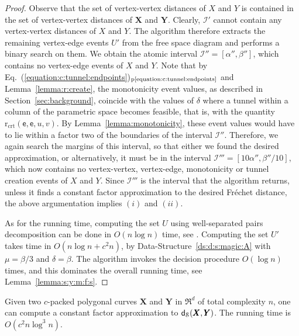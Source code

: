 \documentclass[12pt]{article}
\newcommand{\secref}[1]{Section~\ref{sec:#1}}
\newcommand{\lemlab}[1]{\label{lemma:#1}}
\newcommand{\lemref}[1]{Lemma~\ref{lemma:#1}}
\newcommand{\Eqrefpage}[1]{Eq.~(\ref{equation:#1})$_\text{p\pageref{equation:#1}}$}
\newcommand{\dsref}[1]{Data-Structure~\ref{ds:#1}}
\newcommand{\Frechet}{Fr\'{e}c{h}e{}t\xspace}\providecommand{\Arr}{\mathop{\mathrm{\EuScript{A}}}}
\newcommand{\distoSFr}[2]{\mathsf{d}_{\EuScript{S}}\pth{#1,#2}}
\newcommand{\SimplifyX}[1]{#1}
\newcommand{\cXBase}{X} \newcommand{\cYBase}{Y} \newcommand{\crvCBase}{{\pi}}
\newcommand{\cX}{\SimplifyX{\cXBase}}
\newcommand{\cXOrig}{\pmb{\cXBase}}
\newcommand{\cY}{\SimplifyX{\cYBase}}
\newcommand{\cYOrig}{\pmb{\cYBase}}
\providecommand{\pth}[2][\!]{#1\left({#2}\right)}
\newcommand{\edge}{\mathsf{e}}
\newcommand{\rCreate}[4]{\mathrm{r}_{\mathrm{crt}}\pth{#1, #2, #3,#4}}
\newcommand{\Interval}{\mathcal{I}}
\numberwithin{figure}{section}
\numberwithin{equation}{section}
\begin{document}
\begin{proof}
    Observe that the set of vertex-vertex distances of $\cX$ and $\cY$
    is contained in the set of vertex-vertex distances of $\cXOrig$
    and $\cYOrig$. Clearly, $\Interval'$ cannot contain any
    vertex-vertex distances of $\cX$ and $\cY$.  The algorithm
    therefore extracts the remaining vertex-edge events $U'$ from the
    free space diagram and performs a binary search on them.  We
    obtain the atomic interval $\Interval''=[\alpha'',\beta'']$, which
    contains no vertex-edge events of $\cX$ and
    $\cY$. Note that by \Eqrefpage{c:tunnel:endpoints} and \lemref{r:create},
    the monotonicity event values, as described in
    \secref{background}, coincide with the values of $\delta$ where a
    tunnel within a column of the parametric space becomes feasible,
    that is, with the quantity $\rCreate{\edge}{\edge}{u}{v}$.  By
    \lemref{monotonicity}, these event values would have to lie within
    a factor two of the boundaries of the interval $\Interval''$.
    Therefore, we again search the margins of this interval, so that
    either we found the desired approximation, or alternatively, it
    must be in the interval $\Interval'''=[10\alpha'', \beta''/10]$,
    which now contains no vertex-vertex, vertex-edge, monotonicity or
    tunnel creation events of $\cX$ and $\cY$.  Since $\Interval'''$
    is the interval that the algorithm returns, unless it finds a
    constant factor approximation to the desired \Frechet distance,
    the above argumentation implies $(i)$ and $(ii)$.
    
    As for the running time, computing the set $U$ using
    well-separated pairs decomposition can be done in $O(n \log n)$
    time, see \cite{dhw-afdrc-12}.  Computing the set $U'$ takes time
    in $O( n \log n + c^2n )$, by \dsref{d:s:magic:A} with
    $\mu=\beta/3$ and $\delta=\beta$.  The algorithm invokes the
    decision procedure $O(\log n)$ times, and this dominates the
    overall running time, see \lemref{s:y:m:f:s}.
\end{proof}

\begin{lemma}\lemlab{rand:algo}Given two $c$-packed polygonal curves $\cXOrig$ and $\cYOrig$ in
    $\Re^d$ of total complexity $n$, one can compute a constant factor
    approximation to $\distoSFr{\cXOrig}{\cYOrig}$.  The running time
    is $O\pth{ c^2 n\log^3 n}$.
\end{lemma}
\end{document}
